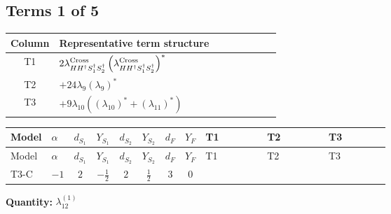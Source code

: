 \documentclass[8pt]{article}
\begin{document}
\begin{landscape}
\subsection*{Terms 1 of 5}
\begin{center}
\begin{tabular}{@{}c >{\raggedright\arraybackslash}p{0.82\linewidth}@{}}
\toprule
Column & Representative term structure \\
\midrule
T1 & \(\displaystyle 2 {\lambda_{H H^\dagger S_1^\dagger S_2^\dagger}^{\rm Cross}} \left({\lambda_{H H^\dagger S_1^\dagger S_2^\dagger}^{\rm Cross}}\right)^{*}\) \\
\midrule
T2 & \(\displaystyle +24 {\lambda_{9}} \left({\lambda_{9}}\right)^{*}\) \\
\midrule
T3 & \(\displaystyle +9 {\lambda_{10}} (\left({\lambda_{10}}\right)^{*}+\left({\lambda_{11}}\right)^{*})\) \\
\midrule
\bottomrule
\end{tabular}
\end{center}
\smallskip
\tiny
\begin{longtable}{@{}llcccccc >{\raggedright\arraybackslash}p{0.21\linewidth} >{\raggedright\arraybackslash}p{0.21\linewidth} >{\raggedright\arraybackslash}p{0.21\linewidth}@{}}
\toprule
Model & $\alpha$ & $d_{S_1}$ & $Y_{S_1}$ & $d_{S_2}$ & $Y_{S_2}$ & $d_F$ & $Y_F$ & T1 & T2 & T3 \\
\midrule
\endfirsthead
\toprule
Model & $\alpha$ & $d_{S_1}$ & $Y_{S_1}$ & $d_{S_2}$ & $Y_{S_2}$ & $d_F$ & $Y_F$ & T1 & T2 & T3 \\
\midrule
\endhead
T3-C & $-1$ & $2$ & $-\frac{1}{2}$ & $2$ & $\frac{1}{2}$ & $3$ & $0$ & \scriptsize\adjustbox{max width=\linewidth}{$\begin{gathered} 2 {\lambda_{H H^\dagger S_1^\dagger S_2^\dagger}^{\rm Cross}} \left({\lambda_{H H^\dagger S_1^\dagger S_2^\dagger}^{\rm Cross}}\right)^{*}\end{gathered}$} & \scriptsize\adjustbox{max width=\linewidth}{$\begin{gathered} +24 {\lambda_{9}} \left({\lambda_{9}}\right)^{*}\end{gathered}$} & \scriptsize\adjustbox{max width=\linewidth}{$\begin{gathered} +9 {\lambda_{10}} (\left({\lambda_{10}}\right)^{*}+\left({\lambda_{11}}\right)^{*}) \\ +9 {\lambda_{11}} (\left({\lambda_{10}}\right)^{*}+\left({\lambda_{11}}\right)^{*})\end{gathered}$} \\
\midrule
\bottomrule
\end{longtable}
\clearpage
\noindent\textbf{Quantity: }$\lambda_{12}^{(1)}$\par\smallskip

\end{landscape}
\end{document}
